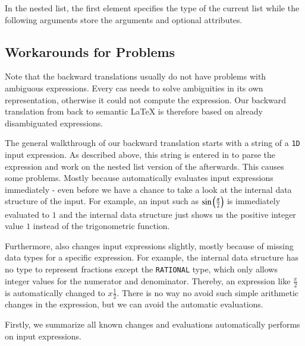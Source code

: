 In the nested list, the first element specifies the type of the current list while the following arguments store the arguments and optional attributes.

\subsection{Workarounds for Problems}\label{subsec:maple-probs}
Note that the backward translations usually do not have problems with ambiguous expressions. Every \gls{cas} needs to solve ambiguities in its own representation, otherwise it could not compute the expression. Our backward translation from \Maple{} back to semantic \LaTeX{} is therefore based on already disambiguated expressions.

The general walkthrough of our backward translation starts with a string of a \texttt{1D} \Maple{} input expression. As described above, this string is entered in \Maple{} to parse the expression and work on the nested list version of the \inertF{} afterwards. This causes some problems. Mostly because \Maple{} automatically evaluates input expressions immediately - even before we have a chance to take a look at the internal data structure of the input. For example, an input such as $\sin\left(\frac{{\pi}}{2}\right)$ is immediately evaluated to $1$ and the internal data structure just shows us the positive integer value $1$ instead of the trigonometric function.

Furthermore, \Maple{} also changes input expressions slightly, mostly because of missing data types for a specific expression. For example, the internal data structure has no type to represent fractions except the \texttt{RATIONAL} type, which only allows integer values for the numerator and denominator. Thereby, an expression like $\frac{x}{2}$ is automatically changed to $x\frac{1}{2}$. There is no way no avoid such simple arithmetic changes in the expression, but we can avoid the automatic evaluations.

Firstly, we summarize all known changes and evaluations \Maple{} automatically performs on input expressions.

